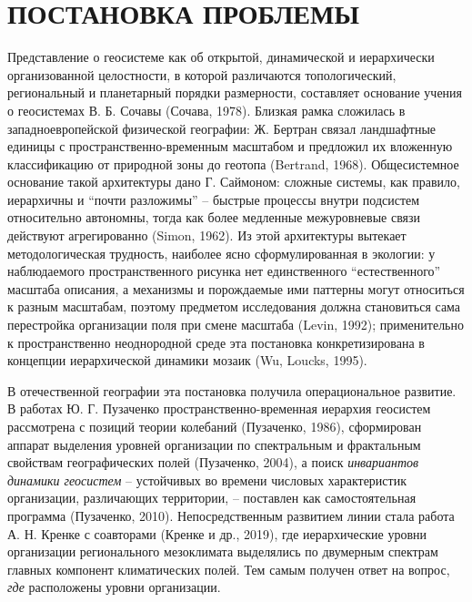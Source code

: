 \documentclass[12pt,a4paper]{article}
\begin{document}
\section{ПОСТАНОВКА ПРОБЛЕМЫ}

Представление о геосистеме как об открытой, динамической и иерархически организованной целостности, в которой различаются топологический, региональный и планетарный порядки размерности, составляет основание учения о геосистемах В. Б. Сочавы (Сочава, 1978). Близкая рамка сложилась в западноевропейской физической географии: Ж. Бертран связал ландшафтные единицы с пространственно-временным масштабом и предложил их вложенную классификацию от природной зоны до геотопа (Bertrand, 1968). Общесистемное основание такой архитектуры дано Г. Саймоном: сложные системы, как правило, иерархичны и “почти разложимы” -- быстрые процессы внутри подсистем относительно автономны, тогда как более медленные межуровневые связи действуют агрегированно (Simon, 1962). Из этой архитектуры вытекает методологическая трудность, наиболее ясно сформулированная в экологии: у наблюдаемого пространственного рисунка нет единственного “естественного” масштаба описания, а механизмы и порождаемые ими паттерны могут относиться к разным масштабам, поэтому предметом исследования должна становиться сама перестройка организации поля при смене масштаба (Levin, 1992); применительно к пространственно неоднородной среде эта постановка конкретизирована в концепции иерархической динамики мозаик (Wu, Loucks, 1995).

В отечественной географии эта постановка получила операциональное развитие. В работах Ю. Г. Пузаченко пространственно-временная иерархия геосистем рассмотрена с позиций теории колебаний (Пузаченко, 1986), сформирован аппарат выделения уровней организации по спектральным и фрактальным свойствам географических полей (Пузаченко, 2004), а поиск \emph{инвариантов динамики геосистем} -- устойчивых во времени числовых характеристик организации, различающих территории, -- поставлен как самостоятельная программа (Пузаченко, 2010). Непосредственным развитием линии стала работа А. Н. Кренке с соавторами (Кренке и др., 2019), где иерархические уровни организации регионального мезоклимата выделялись по двумерным спектрам главных компонент климатических полей. Тем самым получен ответ на вопрос, \emph{где} расположены уровни организации.
\end{document}
